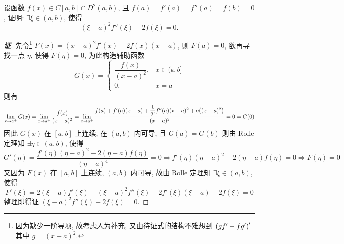 \begin{example}
    设函数 $f(x)\in C[a,b]\cap D^2(a,b)$, 且 $f(a)=f'(a)=f''(a)=f(b)=0$, 证明: $\exists \xi\in(a,b)$, 使得 $$(\xi-a)^2f''(\xi)-2f(\xi)=0.$$
\end{example}
\begin{proof}[{\songti \textbf{证}}]
    先令\footnote{因为缺少一阶导项, 故考虑人为补充, 又由待证式的结构不难想到 $\qty(gf'-fg')'$ 其中 $g=(x-a)^2$.} $F(x)=(x-a)^2f'(x)-2f(x)(x-a)$, 则 $F(a)=0$, 欲再寻找一点 $\eta$, 使得 $F(\eta)=0$, 为此构造辅助函数
    $$G(x)=\begin{cases}
            \dfrac{f(x)}{(x-a)^2}, & x\in(a,b] \\
            0,                     & x=a
        \end{cases}$$
    则有 $$\displaystyle\lim_{x\to a^+}G(x)=\lim_{x\to a^+}\dfrac{f(x)}{(x-a)^2} =\lim_{x\to a^+}\dfrac{f(a)+f'(a)(x-a)+\dfrac{1}{2!}f''(a)(x-a)^2+o\qty((x-a)^2)}{(x-a)^2}=0=G(0)$$ 
    因此 $G(x)$ 在 $[a,b]$ 上连续, 在 $(a,b)$ 内可导, 且 $G(a)=G(b)$ 则由 Rolle 定理知
    $\exists\eta\in(a,b)$, 使得 $$G'(\eta)=\dfrac{f'(\eta)(\eta-a)^2-2(\eta-a)f(\eta)}{(\eta-a)^4}=0\Rightarrow f'(\eta)(\eta-a)^2-2(\eta-a)f(\eta)=0\Rightarrow F(\eta)=0$$
    又因为 $F(x)$ 在 $[a,b]$ 上连续, $(a,b)$ 内可导, 故由 Rolle 定理知 $\exists\xi\in(a,b)$, 使得 $$F'(\xi)=2(\xi-a)f'(\xi)+(\xi-a)^2f''(\xi)-2f'(\xi)(\xi-a)-2f(\xi)=0$$
    整理即得证 $(\xi-a)^2f''(\xi)-2f(\xi)=0.$
\end{proof}
